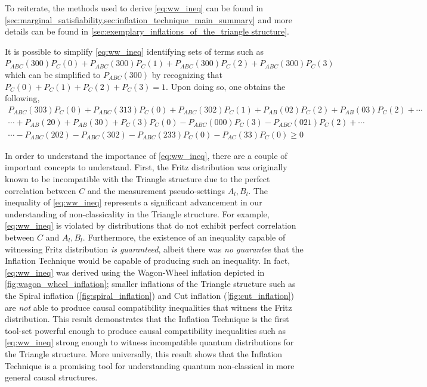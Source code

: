 \documentclass[aps, 10pt, english, twoside, pra, nofootinbib, tightenlines, longbibliography, superscriptaddress]{revtex4-1}
\begin{document}
    To reiterate, the methods used to derive \cref{eq:ww_ineq} can be found in \cref{sec:marginal_satisfiability,sec:inflation_technique_main_summary} and more details can be found in \cref{sec:exemplary_inflations_of_the_triangle structure}.

    It is possible to simplify \cref{eq:ww_ineq} identifying sets of terms such as $P_{ABC}(300)P_{C}(0) + P_{ABC}(300)P_{C}(1) + P_{ABC}(300)P_{C}(2) + P_{ABC}(300)P_{C}(3)$ which can be simplified to $P_{ABC}(300)$ by recognizing that $P_{C}(0) + P_{C}(1) + P_{C}(2) + P_{C}(3) = 1$. Upon doing so, one obtains the following,
    \begin{gather*}
        P_{ABC}(303)P_{C}(0) + P_{ABC}(313)P_{C}(0) + P_{ABC}(302)P_{C}(1) + P_{AB}(02)P_{C}(2) + P_{AB}(03)P_{C}(2) + \cdots \\
        \cdots + P_{AB}(20) + P_{AB}(30) + P_{C}(3)P_{C}(0) - P_{ABC}(000)P_{C}(3) - P_{ABC}(021)P_{C}(2) + \cdots \\
        \cdots - P_{ABC}(202) - P_{ABC}(302) - P_{ABC}(233)P_{C}(0) - P_{AC}(33)P_{C}(0) \geq 0
    \end{gather*}

    In order to understand the importance of \cref{eq:ww_ineq}, there are a couple of important concepts to understand. First, the Fritz distribution was originally known to be incompatible with the Triangle structure due to the perfect correlation between $C$ and the measurement pseudo-settings $A_l, B_l$. The inequality of \cref{eq:ww_ineq} represents a significant advancement in our understanding of non-classicality in the Triangle structure. For example, \cref{eq:ww_ineq} is violated by distributions that do not exhibit perfect correlation between $C$ and $A_l, B_l$. Furthermore, the existence of an inequality capable of witnessing Fritz distribution \textit{is guaranteed}, albeit there was \textit{no guarantee} that the Inflation Technique would be capable of producing such an inequality. In fact, \cref{eq:ww_ineq} was derived using the Wagon-Wheel inflation depicted in \cref{fig:wagon_wheel_inflation}; smaller inflations of the Triangle structure such as the Spiral inflation (\cref{fig:spiral_inflation}) and Cut inflation (\cref{fig:cut_inflation}) are \textit{not} able to produce causal compatibility inequalities that witness the Fritz distribution. This result demonstrates that the Inflation Technique is the first tool-set powerful enough to produce causal compatibility inequalities such as \cref{eq:ww_ineq} strong enough to witness incompatible quantum distributions for the Triangle structure. More universally, this result shows that the Inflation Technique is a promising tool for understanding quantum non-classical in more general causal structures.
\end{document}
